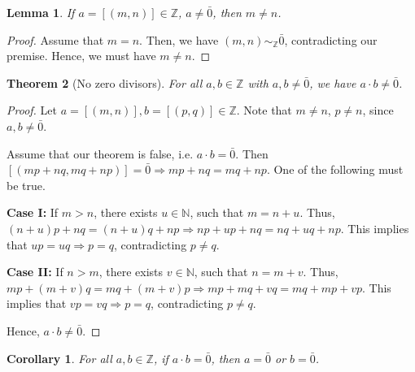 \documentclass[10pt]{article}
\newtheorem{theorem}{Theorem}[section]
\newtheorem{lemma}[theorem]{Lemma}
\newtheorem{corollary}{Corollary}[theorem]
\theoremstyle{definition}
\theoremstyle{remark}
\newcommand{\N}{\mathbb{N}}
\newcommand{\Z}{\mathbb{Z}}
\newcommand{\simZ}{\sim_{\Z}}
\begin{document}
        \begin{lemma}
                If $a = [(m, n)] \in \Z$, $a \neq \bar{0}$, then $m \neq n$.
        \end{lemma}
        \begin{proof}
                Assume that $m = n$. Then, we have $(m, n) \simZ \bar{0}$,
                contradicting our premise. Hence, we must have $m\neq n$.
        \end{proof}
        \begin{theorem}[No zero divisors]
                For all $a, b \in \Z$ with $a,b \neq \bar{0}$, we have $a\cdot b \neq \bar{0}$.
        \end{theorem}
        \begin{proof}
                Let $a = [(m, n)], b = [(p, q)] \in \Z$.
                Note that $m\neq n$, $p\neq n$, since $a, b \neq \bar{0}$.

                Assume that our theorem is false, i.e. $a\cdot b = \bar{0}$.
                Then $[(mp + nq, mq + np)] = \bar{0} \Rightarrow mp + nq = mq + np$.
                One of the following must be true.
                
                \par\textbf{Case I:} If $m > n$, there exists $u \in \N$, such that $m = n + u$. Thus, $(n + u)p + nq = (n + u)q + np \Rightarrow np + up + nq = nq + uq + np$.
                This implies that $up = uq \Rightarrow p = q$, contradicting $p\neq q$.
                \par\textbf{Case II:} If $n > m$, there exists $v \in \N$, such that $n = m + v$. Thus, $mp + (m + v)q = mq + (m + v)p\Rightarrow mp + mq + vq = mq + mp + vp$.
                This implies that $vp = vq \Rightarrow p = q$, contradicting $p\neq q$.

                Hence, $a\cdot b \neq \bar{0}$.
        \end{proof}
        \begin{corollary}
        \label{cor:zero}
                For all $a, b \in \Z$, if $a\cdot b = \bar{0}$, then $a = \bar{0}$ or 
                $b = \bar{0}$.
        \end{corollary}
\end{document}
